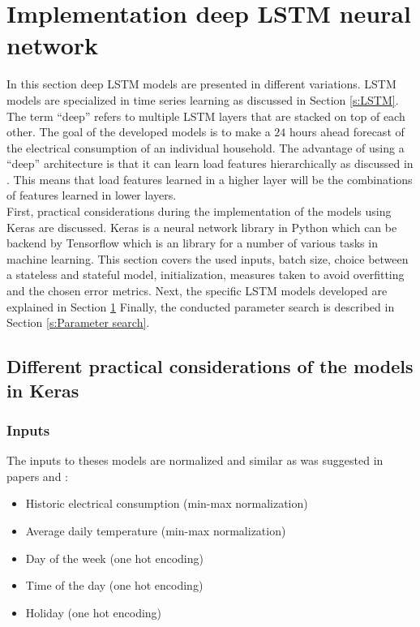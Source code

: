 \section{Implementation deep LSTM neural network}\label{s:Implementation deep LSTM neural network}
In this section deep LSTM models are presented in different variations. LSTM models are specialized in time series learning as discussed in Section \ref{s:LSTM}. The term ``deep'' refers to multiple LSTM layers that are stacked on top of each other. The goal of the developed models is to make a $ 24 $ hours ahead forecast of the electrical consumption of an individual household. The advantage of using a ``deep'' architecture is that it can learn load features hierarchically as discussed in \cite{Shi2018}. This means that load features learned in a higher layer will be the combinations of features learned in lower layers.\\
First, practical considerations during the implementation of the models using Keras are discussed. Keras is a neural network library in Python which can be backend by Tensorflow which is an library for a number of various tasks in machine learning. This section covers the used inputs, batch size, choice between a stateless and stateful model, initialization, measures taken to avoid overfitting and the chosen error metrics. Next, the specific LSTM models developed are explained in Section \ref{s:Implementation deep LSTM neural network} Finally, the conducted parameter search is described in Section \ref{s:Parameter search}.

\subsection{Different practical considerations of the models in Keras}

\subsubsection{Inputs}\label{s:Inputs}
The inputs to theses models are normalized and similar as was suggested in papers \cite{loadforecastingmoor} and \cite{Kong2019}: 

\begin{itemize}
	\item Historic electrical consumption (min-max normalization)
	\item Average daily temperature (min-max normalization)
	\item Day of the week (one hot encoding)
	\item Time of the day (one hot encoding)
	\item Holiday (one hot encoding)
\end{itemize}

